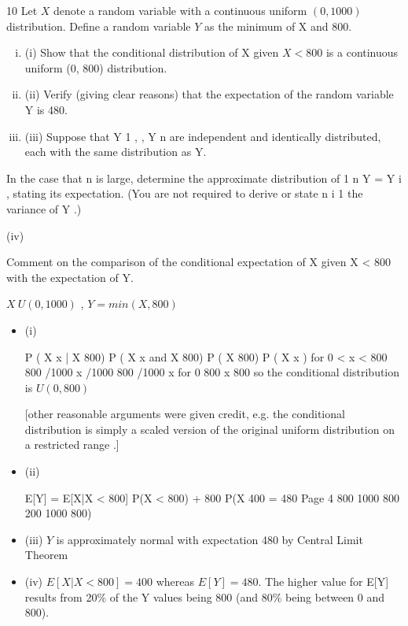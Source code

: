 \documentclass[a4paper,12pt]{article}
\begin{document}
10
Let $X$ denote a random variable with a continuous uniform $(0, 1000)$ distribution. Define a random variable $Y$ as the minimum of X and 800.

\begin{enumerate}[(i)]
\item (i) Show that the conditional distribution of X given $X < 800$ is a continuous uniform (0, 800) distribution.
\item (ii) Verify (giving clear reasons) that the expectation of the random variable Y is 480.
\item (iii) Suppose that Y 1 , , Y n are independent and identically distributed, each with the same distribution as Y.
\end{enumerate}
In the case that n is large, determine the approximate distribution of
1 n
Y =
Y i , stating its expectation. (You are not required to derive or state
n i 1
the variance of Y .)

(iv)

Comment on the comparison of the conditional expectation of X given X < 800 with the expectation of Y.

\newpage

$X ~ U(0,1000)$ , $Y = min(X,800)$

\begin{itemize}
\item (i)

P ( X
x | X
800)
P ( X
x and X 800)
P ( X 800)
P ( X x )
for 0 < x < 800
800 /1000
x /1000
800 /1000
x
for 0
800
x 800
so the conditional distribution is $U(0,800)$

[other reasonable arguments were given credit, e.g. the conditional distribution is simply a scaled version of the original uniform distribution on a restricted range .]

\item 
(ii)

E[Y] = E[X|X < 800] P(X < 800) + 800 P(X
400
= 480
Page 4
800
1000
800
200
1000
800)

\item 
(iii) $Y$ is approximately normal with expectation 480 by Central Limit Theorem

\item (iv) $E[X | X < 800] = 400$ whereas $E[Y] = 480$.
The higher value for E[Y] results from 20\% of the Y values being 800 (and 80\% being between 0 and 800).
\end{itemize}
\end{document}
